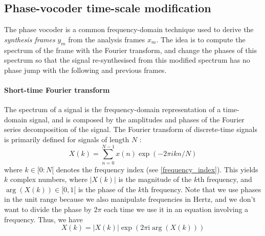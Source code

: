 \documentclass[letterpaper]{article}
\begin{document}
\subsection{Phase-vocoder time-scale modification}
The phase vocoder is a common frequency-domain technique used to derive the
\emph{synthesis frames} \(y_m\)  from the analysis frames \(x_m\). The idea
is to compute the spectrum of the frame with the Fourier transform, and change
the phases of this spectrum so that the signal re-synthesised from this modified
spectrum has no phase jump with the following and previous frames.
\paragraph{Short-time Fourier transform}
The spectrum of a signal is the frequency-domain representation of
a time-domain signal, and is composed by the amplitudes and phases of the
Fourier series decomposition of the signal. The Fourier transform of
discrete-time signals is primarily defined for signals of length \(N\)
\citep{bracewell1986fourier}:
\begin{equation}
	  X(k) = \sum_{n=0}^{N-1}x(n)\exp(-2\pi ikn/N)
\end{equation}
where \(k\in [0:N[\) denotes the frequency index (see \eqref{frequency_index}).
This yields \(k\) complex numbers, where \(|X(k)|\) is the magnitude of the
\(k\)th frequency, and \(\arg(X(k))\in[0,1[\) is the phase of the \(k\)th
frequency. Note that we use phases in the unit range because we also manipulate
frequencies in Hertz, and we don't want to divide the phase by \(2\pi\) each
time we use it in an equation
involving a frequency. Thus, we have
\begin{equation}
		X(k)= |X(k)|\exp(2\pi \text{i} \arg(X(k)))
\end{equation}
\end{document}
